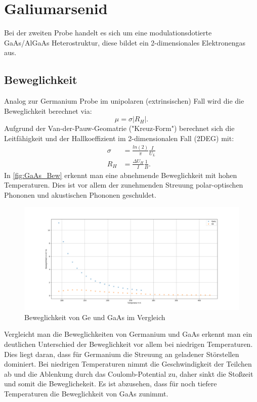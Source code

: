 
\section{Galiumarsenid}
Bei der zweiten Probe handelt es sich um eine modulationsdotierte GaAs/AlGaAs Heterostruktur, diese bildet ein 2-dimensionales Elektronengas aus.
\subsection{Beweglichkeit}
Analog zur Germanium Probe im unipolaren (extrinsischen) Fall wird die die Beweglichkeit berechnet via:
\begin{equation}
    \mu = \sigma |R_H|.
\end{equation}
Aufgrund der Van-der-Pauw-Geomatrie ("Kreuz-Form") berechnet sich die Leitfähigkeit und der Hallkoeffizient im 2-dimensionalen Fall (2DEG) mit:
\begin{align}
    \sigma &= \frac{ln(2)}{\pi} \frac{I}{U_L} \\
    R_H &= \frac{\Delta U_H}{I} \frac{1}{B}.
\end{align}
In \autoref{fig:GaAs_Bew} erkennt man eine abnehmende Beweglichkeit mit hohen Temperaturen. Dies ist vor allem der zunehmenden Streuung polar-optischen Phononen und akustischen Phononen geschuldet.
\begin{figure}
    \centering
    \includegraphics[width=1.0\textwidth]{./fig/GaAs_bew.png}
    \caption{Beweglichkeit von Ge und GaAs im Vergleich}
    \label{fig:GaAs_Bew}
\end{figure}

Vergleicht man die Beweglichkeiten von Germanium und GaAs erkennt man ein deutlichen Unterschied der Beweglichkeit vor allem bei niedrigen Temperaturen. Dies liegt daran, dass für Germanium die Streuung an geladener Störstellen dominiert. Bei niedrigen Temperaturen nimmt die Geschwindigkeit der Teilchen ab und die Ablenkung durch das Coulomb-Potential zu, daher sinkt die Stoßzeit und somit die Beweglichekeit.
Es ist abzusehen, dass für noch tiefere Temperaturen die Beweglichkeit von GaAs zunimmt.

